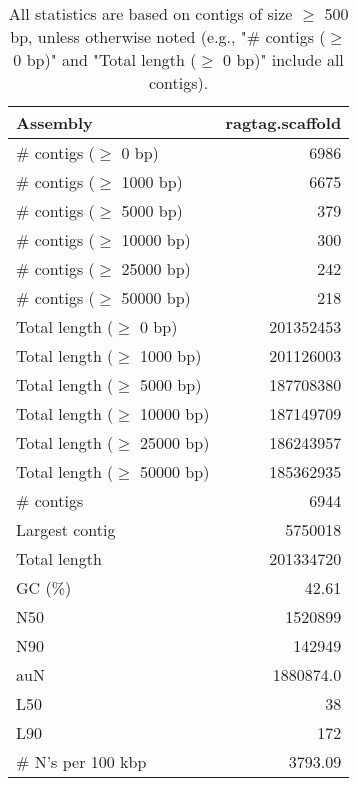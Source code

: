 \documentclass[12pt,a4paper]{article}
\begin{document}
\begin{table}[ht]
\begin{center}
\caption{All statistics are based on contigs of size $\geq$ 500 bp, unless otherwise noted (e.g., "\# contigs ($\geq$ 0 bp)" and "Total length ($\geq$ 0 bp)" include all contigs).}
\begin{tabular}{|l*{1}{|r}|}
\hline
Assembly & ragtag.scaffold \\ \hline
\# contigs ($\geq$ 0 bp) & 6986 \\ \hline
\# contigs ($\geq$ 1000 bp) & 6675 \\ \hline
\# contigs ($\geq$ 5000 bp) & 379 \\ \hline
\# contigs ($\geq$ 10000 bp) & 300 \\ \hline
\# contigs ($\geq$ 25000 bp) & 242 \\ \hline
\# contigs ($\geq$ 50000 bp) & 218 \\ \hline
Total length ($\geq$ 0 bp) & 201352453 \\ \hline
Total length ($\geq$ 1000 bp) & 201126003 \\ \hline
Total length ($\geq$ 5000 bp) & 187708380 \\ \hline
Total length ($\geq$ 10000 bp) & 187149709 \\ \hline
Total length ($\geq$ 25000 bp) & 186243957 \\ \hline
Total length ($\geq$ 50000 bp) & 185362935 \\ \hline
\# contigs & 6944 \\ \hline
Largest contig & 5750018 \\ \hline
Total length & 201334720 \\ \hline
GC (\%) & 42.61 \\ \hline
N50 & 1520899 \\ \hline
N90 & 142949 \\ \hline
auN & 1880874.0 \\ \hline
L50 & 38 \\ \hline
L90 & 172 \\ \hline
\# N's per 100 kbp & 3793.09 \\ \hline
\end{tabular}
\end{center}
\end{table}
\end{document}

